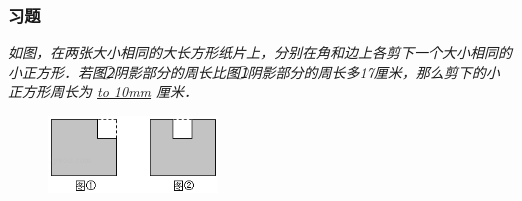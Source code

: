 \begin{frame}
    \frametitle{习题\theframecounter}
    \vspace*{-1cm}
    \textit{如图，在两张大小相同的大长方形纸片上，分别在角和边上各剪下一个大小相同的小正方形．若图\textcircled{2}阴影部分的周长比图\textcircled{1}阴影部分的周长多17厘米，那么剪下的小正方形周长为 \underline{\hbox to 10mm{}} 厘米．} \\
    \begin{figure}[H] 
        \centering
        \includegraphics[width=0.4\textwidth]{./pics/Chapter_3/15.png}
    \end{figure}
\end{frame}